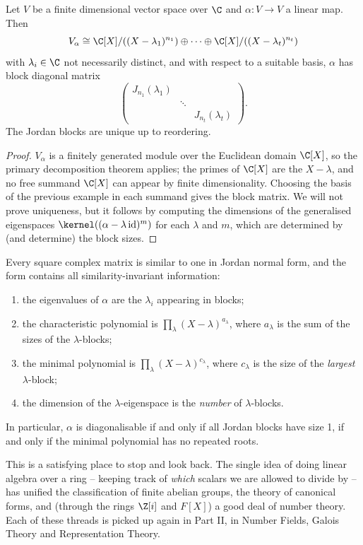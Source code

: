 \begin{theorem}
	Let $V$ be a finite dimensional vector space over $\C$ and $\alpha: V \rightarrow V$ a linear map. Then
	$$
	V_{\alpha} \cong \C[X]/((X - \lambda_1)^{n_1}) \oplus \cdots \oplus \C[X]/((X - \lambda_t)^{n_t})
	$$
	with $\lambda_i \in \C$ not necessarily distinct, and with respect to a suitable basis, $\alpha$ has block diagonal matrix
	$$
	\begin{pmatrix}
		J_{n_1}(\lambda_1) & & \\
		& \ddots & \\
		& & J_{n_t}(\lambda_t)
	\end{pmatrix}.
	$$
	The Jordan blocks are unique up to reordering.
\end{theorem}
\begin{proof}
	$V_{\alpha}$ is a finitely generated module over the Euclidean domain $\C[X]$, so the primary decomposition theorem applies; the primes of $\C[X]$ are the $X - \lambda$, and no free summand $\C[X]$ can appear by finite dimensionality. Choosing the basis of the previous example in each summand gives the block matrix. We will not prove uniqueness, but it follows by computing the dimensions of the generalised eigenspaces $\kernel((\alpha - \lambda\operatorname{id})^m)$ for each $\lambda$ and $m$, which are determined by (and determine) the block sizes.
\end{proof}

\begin{remark}
	Every square complex matrix is similar to one in Jordan normal form, and the form contains all similarity-invariant information:
	\begin{enumerate}[label=(\roman*)]
		\item the eigenvalues of $\alpha$ are the $\lambda_i$ appearing in blocks;
		\item the characteristic polynomial is $\prod_{\lambda}(X - \lambda)^{a_\lambda}$, where $a_{\lambda}$ is the sum of the sizes of the $\lambda$-blocks;
		\item the minimal polynomial is $\prod_{\lambda}(X - \lambda)^{c_\lambda}$, where $c_{\lambda}$ is the size of the \emph{largest} $\lambda$-block;
		\item the dimension of the $\lambda$-eigenspace is the \emph{number} of $\lambda$-blocks.
	\end{enumerate}
	In particular, $\alpha$ is diagonalisable if and only if all Jordan blocks have size 1, if and only if the minimal polynomial has no repeated roots.
\end{remark}

This is a satisfying place to stop and look back. The single idea of doing linear algebra over a ring -- keeping track of \emph{which} scalars we are allowed to divide by -- has unified the classification of finite abelian groups, the theory of canonical forms, and (through the rings $\Z[i]$ and $F[X]$) a good deal of number theory. Each of these threads is picked up again in Part II, in Number Fields, Galois Theory and Representation Theory.

